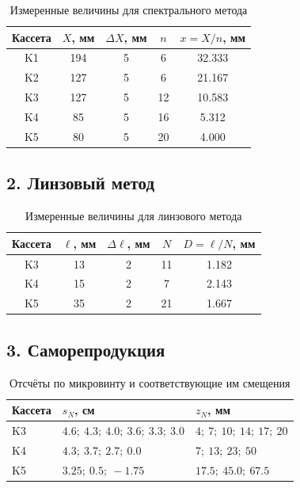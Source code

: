 \documentclass[twoside]{mfitjournal}
\begin{document}
\begin{table}[H]
\centering
\caption{Измеренные величины для спектрального метода}
\begin{tabular}{ccccc}
\toprule
Кассета & $X$, мм & $\Delta X$, мм & $n$ & $x = X/n$, мм \\
\midrule
K1 & 194 & 5 & 6  & 32.333 \\
K2 & 127 & 5 & 6  & 21.167 \\
K3 & 127 & 5 & 12 & 10.583 \\
K4 & 85  & 5 & 16 & 5.312 \\
K5 & 80  & 5 & 20 & 4.000 \\
\bottomrule
\end{tabular}
\end{table}

\subsection*{2. Линзовый метод}

\begin{table}[H]
\centering
\caption{Измеренные величины для линзового метода}
\begin{tabular}{ccccc}
\toprule
Кассета & $\ell$, мм & $\Delta \ell$, мм & $N$ & $D = \ell/N$, мм \\
\midrule
K3 & 13 & 2 & 11 & 1.182 \\
K4 & 15 & 2 & 7  & 2.143 \\
K5 & 35 & 2 & 21 & 1.667 \\
\bottomrule
\end{tabular}
\end{table}

\subsection*{3. Саморепродукция}

\begin{table}[H]
\centering
\caption{Отсчёты по микровинту и соответствующие им смещения}
\begin{tabular}{p{1.4cm}p{5.0cm}p{4.8cm}}
\toprule
Кассета & $s_N$, см & $z_N$, мм \\
\midrule
K3 & $4.6;\ 4.3;\ 4.0;\ 3.6;\ 3.3;\ 3.0$ & $4;\ 7;\ 10;\ 14;\ 17;\ 20$ \\
K4 & $4.3;\ 3.7;\ 2.7;\ 0.0$ & $7;\ 13;\ 23;\ 50$ \\
K5 & $3.25;\ 0.5;\ -1.75$ & $17.5;\ 45.0;\ 67.5$ \\
\bottomrule
\end{tabular}
\end{table}
\end{document}
